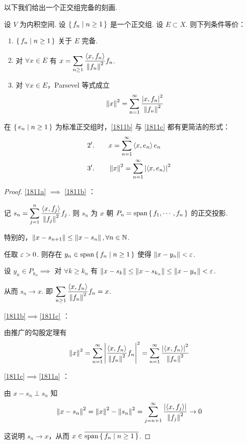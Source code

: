 以下我们给出一个正交组完备的刻画.

\begin{theorem}
    设 $V$ 为内积空间. 设 $\set{f_n|n\ge 1}$ 是一个正交组. 设 $E\subset X$. 则下列条件等价：

    \begin{enumerate}
        \item\label{1811a} $\set{f_n|n\ge 1}$ 关于 $E$ 完备.
        
        \item\label{1811b} 对 $\forall x\in E$ 有 $x=\displaystyle\sum_{n\ge 1}\frac{\left\langle{x,f_n}\right\rangle}{\left\lVert{f_n}\right\rVert^2}f_n$.
        
        \item\label{1811c} 对 $\forall x\in E$，Parsevel 等式成立
$$
\left\lVert{x}\right\rVert^2=\sum_{n=1}^\infty\frac{\left\lvert{x,f_n}\right\rvert^2}{\left\lVert{f_n}\right\rVert^2}
$$
    \end{enumerate}
\end{theorem}

\begin{hint}
    在 $\set{e_n|n\ge 1}$ 为标准正交组时，\ref{1811b} 与 \ref{1811c} 都有更简洁的形式：
$$
\begin{aligned}
    2'. \qquad & x=\sum_{n=1}^\infty\left\langle{x,e_n}\right\rangle e_n\\
    3'. \qquad & \left\lVert{x}\right\rVert^2=\sum_{n=1}^\infty\left\lvert{\left\langle{x,e_n}\right\rangle}\right\rvert^2
\end{aligned}
$$
\end{hint}

\begin{proof}
    \ref{1811a} $\implies$ \ref{1811b} ：

    记 $s_n=\displaystyle\sum_{j=1}^n\frac{\left\langle{x,f_j}\right\rangle}{\left\lVert{f_j}\right\rVert^2}f_j$. 则 $s_n$ 为 $x$ 朝 $P_n=\mathrm{span}\set{f_1,\cdots,f_n}$ 的正交投影.

    特别的，$\left\lVert{x-s_{n+1}}\right\rVert\le\left\lVert{x-s_n}\right\rVert,\forall n\in\mathbb{N}$.

    任取 $\varepsilon>0$. 则存在 $y_n\in\mathrm{span}\set{f_n|n\ge 1}$ 使得 $\left\lVert{x-y_n}\right\rVert<\varepsilon$.

    设 $y_n\in P_{k_n}\implies$ 对 $\forall k\ge k_n$ 有 $\left\lVert{x-s_k}\right\rVert\le\left\lVert{x-s_{k_n}}\right\rVert\le\left\lVert{x-y_n}\right\rVert<\varepsilon$.

    从而 $s_n\to x$. 即 $\displaystyle\sum_{n\ge 1}\frac{\left\langle{x,f_n}\right\rangle}{\left\lVert{f_n}\right\rVert^2}f_n=x$.

    \ref{1811b}$\implies$\ref{1811c} ：

    由推广的勾股定理有
$$
\left\lVert{x}\right\rVert^2=\sum_{n=1}^\infty\left\lvert{\frac{\left\langle{x,f_n}\right\rangle}{\left\lVert{f_n}\right\rVert^2}f_n}\right\rvert^2=\sum_{n=1}^\infty\frac{\left\lvert{\left\langle{x,f_n}\right\rangle}\right\rvert^2}{\left\lVert{f_n}\right\rVert^2}
$$

    \ref{1811c}$\implies$\ref{1811a} ：

    由 $x-s_n\perp s_n$ 知
$$
\left\lVert{x-s_n}\right\rVert^2=\left\lVert{x}\right\rVert^2-\left\lVert{s_n}\right\rVert^2=\sum_{j=n+1}^\infty\frac{\left\lvert{\left\langle{x,f_j}\right\rangle}\right\rvert}{\left\lVert{f_j}\right\rVert^2}\to 0
$$

    这说明 $s_n\to x$，从而 $x\in\overline{\mathrm{span}\set{f_n|n\ge 1}}$.
\end{proof}

